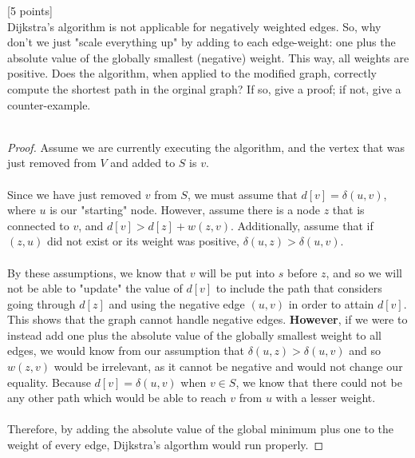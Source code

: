 \documentclass[12pt]{article}
\newcounter{ques}
\newenvironment{question}{\stepcounter{ques}{\noindent\bf Question \arabic{ques}:}}{\vspace{5mm}}
\begin{document}
\begin{question}[5 points]\\
Dijkstra's algorithm is not applicable  for negatively weighted edges. So, why don't we just "scale everything up" by adding to each edge-weight: one plus  the absolute value of the globally smallest (negative) weight. This way, all weights are positive. Does the algorithm, when applied to the modified graph,  correctly compute the shortest path in the orginal graph? If so, give a proof;   if not, give a counter-example.\\\\

\begin{proof}
Assume we are currently executing the algorithm, and the vertex that was just removed from $V$ and added to $S$ is $v$.\\\\
Since we have just removed $v$ from $S$, we must assume that $d[v]=\delta(u,v)$, where $u$ is our "starting" node. However, assume there is a node $z$ that is connected to $v$, and  $d[v] > d[z] + w(z,v)$. Additionally, assume that if $(z,u)$ did not exist or its weight was positive, $\delta(u,z)>\delta(u,v)$.\\\\
By these assumptions, we know that $v$ will be put into $s$ before $z$, and so we will not be able to "update" the value of $d[v]$ to include the path that considers going through $d[z]$ and using the negative edge $(u,v)$ in order to attain $d[v]$. This shows that the graph cannot handle negative edges. \textbf{However}, if we were to instead add one plus the absolute value of the globally smallest weight to all edges, we would know from our assumption that $\delta(u,z)>\delta(u,v)$ and so $w(z,v)$ would be irrelevant, as it cannot be negative and would not change our equality. Because $d[v]=\delta(u,v)$ when $v\in S$, we know that there could not be any other path which would be able to reach $v$ from $u$ with a lesser weight.\\\\
Therefore, by adding the absolute value of the global minimum plus one to the weight of every edge, Dijkstra's algorthm would run properly.
\end{proof}


\end{question}
\end{document}
